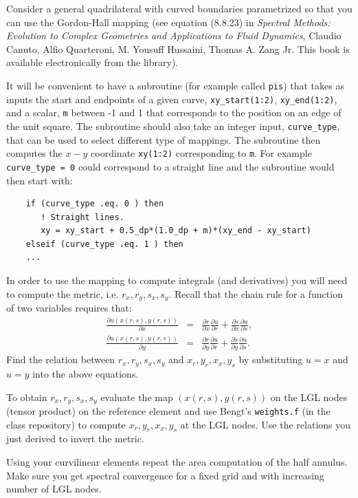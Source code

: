 \documentclass[11pt]{article}
\begin{document}
\begin{enumerate}
Consider a general quadrilateral with curved boundaries parametrized so that you can use the Gordon-Hall mapping (see equation (8.8.23) in {\it Spectral Methods: Evolution to Complex Geometries and Applications to Fluid Dynamics}, Claudio Canuto, Alfio Quarteroni, M. Yousuff Hussaini, Thomas A. Zang Jr. This book is available electronically from the library).

It will be convenient to have a subroutine (for example called \verb+pis+) that takes as inputs the start and endpoints of a given curve,  \verb+xy_start(1:2)+, \verb+xy_end(1:2)+, and a scalar, \verb+m+ between -1 and 1 that corresponds to the position on an edge of the unit square. The subroutine should also take an integer input, \verb+curve_type+, that can be used to select different type of mappings. The subroutine then computes the $x-y$ coordinate \verb+xy(1:2)+ corresponding to \verb+m+. For example \verb+curve_type = 0+ could correspond to a straight line and the subroutine would then start with:
\begin{verbatim}
    if (curve_type .eq. 0 ) then 
       ! Straight lines.
       xy = xy_start + 0.5_dp*(1.0_dp + m)*(xy_end - xy_start) 
    elseif (curve_type .eq. 1 ) then 
    ... 
\end{verbatim}

In order to use the mapping to compute integrals (and derivatives) you will need to compute the metric, i.e. $r_x, r_y, s_x, s_y$. Recall that the chain rule for a function of two variables requires that:    
\begin{eqnarray*}
\frac{\partial u(x(r,s),y(r,s))}{\partial x} &=& \frac{\partial r}{\partial x}\frac{\partial u}{\partial r}+\frac{\partial s}{\partial x}\frac{\partial u}{\partial s}, \\
\frac{\partial u(x(r,s),y(r,s))}{\partial y} &=& \frac{\partial r}{\partial y}\frac{\partial u}{\partial r}+\frac{\partial s}{\partial y}\frac{\partial u}{\partial s}. 
\end{eqnarray*}
Find the relation between  $r_x, r_y, s_x, s_y$ and  $x_r, y_r, x_x, y_s$ by substituting $u = x$ and $u=y$ into the above equations. 

To obtain $r_x, r_y, s_x, s_y$ evaluate the map $(x(r,s),y(r,s))$ on the LGL nodes (tensor product) on the reference element and use Bengt's \verb+weights.f+ (in the class repository) to compute $x_r, y_r, x_x, y_s$ at the LGL nodes. Use the relations you just derived to invert the metric.  

Using your curvilinear elements repeat the area computation of the half annulus. Make sure you get spectral convergence for a fixed grid and with increasing number of LGL nodes.


\end{enumerate}
\end{document}
